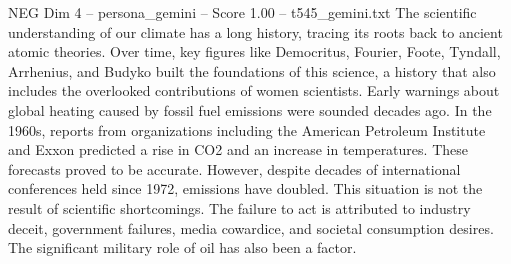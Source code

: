 \begin{textsample}{NEG Dim 4 – persona\_gemini – Score 1.00 – t545\_gemini.txt}  \label{ex:f4_neg_019}
The scientific understanding of our climate has a long history, tracing its roots back to ancient atomic theories.
Over time, key figures like Democritus, Fourier, Foote, Tyndall, Arrhenius, and Budyko built the foundations of this science, a history that also includes the overlooked contributions of women scientists.
Early warnings about global heating caused by fossil fuel emissions were sounded decades ago.
In the 1960s, reports from organizations including the American Petroleum Institute and Exxon predicted a rise in CO2 and an increase in temperatures.
These forecasts proved to be accurate.
However, despite decades of international conferences held since 1972, emissions have doubled.
This situation is not the result of scientific shortcomings.
The failure to act is attributed to industry deceit, government failures, media cowardice, and societal consumption desires.
The significant military role of oil has also been a factor.

\end{textsample}
